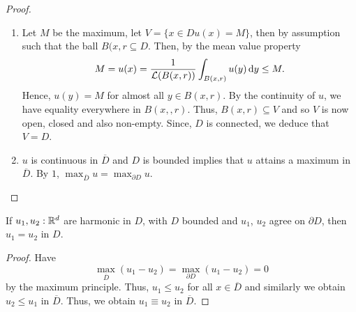 \documentclass{article}
\begin{document}
\begin{proof}
    \begin{enumerate}
	    \item Let $ M$ be the maximum, let $ V = \{x\in D u(x) = M\}$, then by assumption such that the ball $ B(x,r\subseteq D$. Then, by the mean value property 
		    \[
		    M = u(x) = \frac{1}{\mathcal{L}(B(x,r))} \displaystyle\int_{B(x,r)}u(y) \operatorname{d}\! y \leq M.
		    \]
		    Hence, $ u(y) = M$ for almost all $ y\in B(x,r)$. By the continuity of $ u$, we have equality everywhere in $ B(x,,r)$. Thus, $ B(x,r)\subseteq V$ and so $ V$ is now open, closed and also non-empty. Since, $ D$ is connected, we deduce that $ V = D$. 
	    \item $ u$ is continuous in $ \overline{D}$ and $ D$ is bounded implies that $ u$ attains a maximum in $ \overline{D}$. By $ 1$, $ \displaystyle \max_{\overline{D}}u = \displaystyle\max_{\partial D}u$.
    \end{enumerate}
\end{proof}

\begin{boxcor}\label{cor: max principle}
If $ u_{1}, u_{2}:\mathbb{R}^{d}$ are harmonic in $ D$, with $ D$ bounded and $ u_{1}$, $ u_{2}$ agree on $ \partial D$, then $u_{1} = u_{2}$ in $ D$. 
\end{boxcor}

\begin{proof}
    Have 
    \[
	    \displaystyle \max_{\overline{D}}(u_{1}-u_{2})=\displaystyle\max_{\partial D}(u_{1}-u_{2})=0
    \]
    by the maximum principle. Thus, $ u_{1}\leq  u_{2}$ for all $ x\in \overline{D}$ and  similarly we obtain $ u_{2}\leq u_{1}$ in $ \overline{D}$. Thus, we obtain $ u_{1}\equiv u_{2}$ in $ \overline{D}$.
\end{proof}
\end{document}
